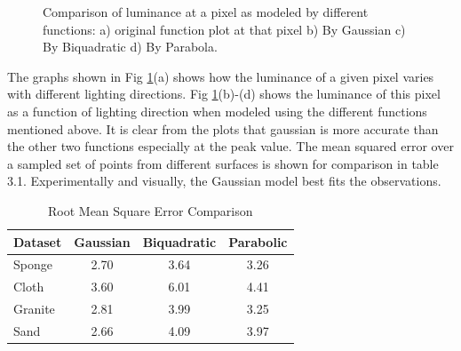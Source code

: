 \begin{figure}[t]
{\label{fig:subfig3}
}
\caption{Comparison of luminance
 at a pixel as modeled by different functions: a) original
function plot at that pixel b) By Gaussian c) By Biquadratic
d) By Parabola.}
\label{fig:graph}
\end{figure}


The graphs shown in Fig \ref{fig:graph}(a) shows how the luminance of a given pixel varies
with different lighting directions. Fig \ref{fig:graph}(b)-(d) shows the luminance of
this pixel as a function of lighting direction when modeled using the different
functions mentioned above. It is clear from the plots that gaussian is more
accurate than the other two functions especially at the peak value. The mean
squared error over a sampled set of points from different surfaces is shown for
comparison in table 3.1. Experimentally and visually, the Gaussian model best fits
the observations.

\begin{table}[ht]
\centering
 \caption{Root Mean Square Error Comparison}
  \begin{tabular}{| l | c | c | c |}
    \hline
    Dataset & Gaussian & Biquadratic & Parabolic\\ \hline
    Sponge & 2.70 & 3.64 & 3.26\\ \hline
    Cloth &  3.60 & 6.01 & 4.41\\ \hline
    Granite & 2.81 & 3.99 & 3.25\\ \hline
    Sand & 2.66 & 4.09 & 3.97\\ \hline
  \end{tabular}
\end{table}


